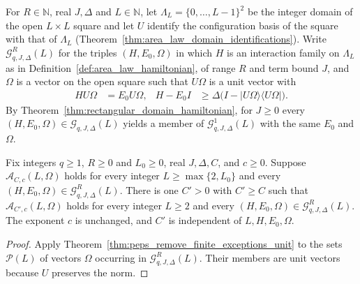 For $R\in\mathbb N$, real $J,\Delta$ and $L\in\mathbb N$, let
$\Lambda_L=\{0,\ldots,L-1\}^2$ be the integer domain of the open $L\times L$
square and let $U$ identify the configuration basis of the square with that
of $\Lambda_L$ (Theorem~\ref{thm:area_law_domain_identifications}). Write
$\mathcal G^{R}_{q,J,\Delta}(L)$ for the triples $(H,E_0,\Omega)$ in which
$H$ is an interaction family on $\Lambda_L$ as in
Definition~\ref{def:area_law_hamiltonian}, of range $R$ and term bound $J$,
and $\Omega$ is a vector on the open square such that $U\Omega$ is a unit
vector with
\begin{align}
    HU\Omega & =E_0U\Omega,
             & H-E_0I       & \ge\Delta\bigl(I-|U\Omega\rangle\langle U\Omega|\bigr).
    \label{eq:peps_finite_range_ground}
\end{align}
By Theorem~\ref{thm:rectangular_domain_hamiltonian}, for $J\ge0$ every
$(H,E_0,\Omega)\in\mathcal G_{q,J,\Delta}(L)$ yields a member of
$\mathcal G^{1}_{q,J,\Delta}(L)$ with the same $E_0$ and $\Omega$.

\begin{theorem}
    \label{thm:peps_remove_finite_exceptions_finite_range}
    \leanok
    Fix integers $q\ge1$, $R\ge0$ and $L_0\ge0$, real $J,\Delta,C$, and
    $c\ge0$. Suppose $\mathcal A_{C,c}(L,\Omega)$ holds for every integer
    $L\ge\max\{2,L_0\}$ and every
    $(H,E_0,\Omega)\in\mathcal G^{R}_{q,J,\Delta}(L)$. There is one $C'>0$
    with $C'\ge C$ such that $\mathcal A_{C',c}(L,\Omega)$ holds for every
    integer $L\ge2$ and every $(H,E_0,\Omega)\in\mathcal G^{R}_{q,J,\Delta}(L)$.
    The exponent $c$ is unchanged, and $C'$ is independent of
    $L,H,E_0,\Omega$.
\end{theorem}
\begin{proof}
    \leanok
    Apply Theorem~\ref{thm:peps_remove_finite_exceptions_unit} to the sets
    $\mathcal P(L)$ of vectors $\Omega$ occurring in
    $\mathcal G^{R}_{q,J,\Delta}(L)$. Their members are unit vectors because
    $U$ preserves the norm.
\end{proof}

